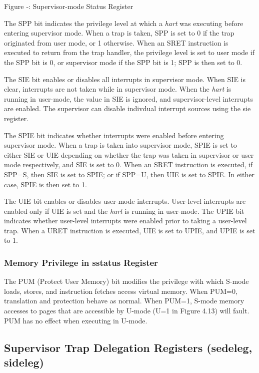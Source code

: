 \missingfigure{}

\protect\hypertarget{_Ref367096223}{}{}Figure ‑: Supervisor-mode Status
Register

The SPP bit indicates the privilege level at which a \emph{hart} was
executing before entering supervisor mode. When a trap is taken, SPP is
set to 0 if the trap originated from user mode, or 1 otherwise. When an
SRET instruction is executed to return from the trap handler, the
privilege level is set to user mode if the SPP bit is 0, or supervisor
mode if the SPP bit is 1; SPP is then set to 0.

The SIE bit enables or disables all interrupts in supervisor mode. When
SIE is clear, interrupts are not taken while in supervisor mode. When
the \emph{hart} is running in user-mode, the value in SIE is ignored,
and supervisor-level interrupts are enabled. The supervisor can disable
indivdual interrupt sources using the sie register.

The SPIE bit indicates whether interrupts were enabled before entering
supervisor mode. When a trap is taken into supervisor mode, SPIE is set
to either SIE or UIE depending on whether the trap was taken in
supervisor or user mode respectively, and SIE is set to 0. When an SRET
instruction is executed, if SPP=S, then SIE is set to SPIE; or if SPP=U,
then UIE is set to SPIE. In either case, SPIE is then set to 1.

The UIE bit enables or disables user-mode interrupts. User-level
interrupts are enabled only if UIE is set and the \emph{hart} is running
in user-mode. The UPIE bit indicates whether user-level interrupts were
enabled prior to taking a user-level trap. When a URET instruction is
executed, UIE is set to UPIE, and UPIE is set to 1.

\subsubsection{Memory Privilege in sstatus Register
}\label{memory-privilege-in-sstatus-register}

The PUM (Protect User Memory) bit modifies the privilege with which
S-mode loads, stores, and instruction fetches access virtual memory.
When PUM=0, translation and protection behave as normal. When PUM=1,
S-mode memory accesses to pages that are accessible by U-mode (U=1 in
Figure 4.13) will fault. PUM has no effect when executing in U-mode.

\subsection{Supervisor Trap Delegation Registers (sedeleg,
sideleg)}\label{supervisor-trap-delegation-registers-sedeleg-sideleg}

